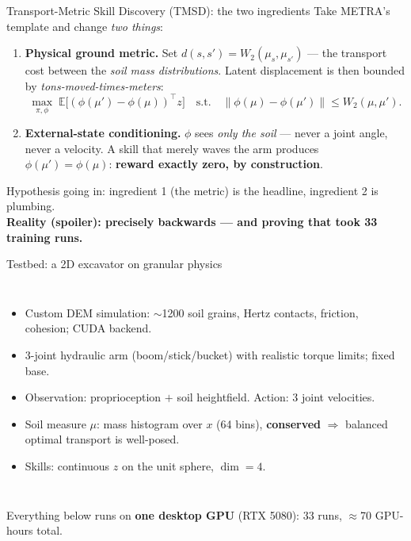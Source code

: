 \documentclass[aspectratio=169,11pt]{beamer}
\begin{document}
\begin{frame}{Transport-Metric Skill Discovery (TMSD): the two ingredients}
Take METRA's template and change \emph{two things}:

\begin{enumerate}
  \item \textbf{Physical ground metric.} Set $d(s,s') = W_2(\mu_s, \mu_{s'})$ --- the transport cost between the \emph{soil mass distributions}. Latent displacement is then bounded by \emph{tons-moved-times-meters}:
  \[
  \max_{\pi,\phi}\; \mathbb{E}\big[(\phi(\mu') - \phi(\mu))^{\top} z\big]
  \quad \text{s.t.} \quad \|\phi(\mu)-\phi(\mu')\| \le W_2(\mu, \mu').
  \]
  \item \textbf{External-state conditioning.} $\phi$ sees \emph{only the soil} --- never a joint angle, never a velocity. A skill that merely waves the arm produces $\phi(\mu')=\phi(\mu)$: \textbf{reward exactly zero, by construction}.
\end{enumerate}

\medskip
Hypothesis going in: ingredient 1 (the metric) is the headline, ingredient 2 is plumbing.\\
\textbf{Reality (spoiler): precisely backwards --- and proving that took 33 training runs.}
\end{frame}

\begin{frame}{Testbed: a 2D excavator on granular physics}
\begin{columns}
\begin{itemize}
  \item Custom DEM simulation: $\sim$1200 soil grains, Hertz contacts, friction, cohesion; CUDA backend.
  \item 3-joint hydraulic arm (boom/stick/bucket) with realistic torque limits; fixed base.
  \item Observation: proprioception $+$ soil heightfield. Action: 3 joint velocities.
  \item Soil measure $\mu$: mass histogram over $x$ (64 bins), \textbf{conserved} $\Rightarrow$ balanced optimal transport is well-posed.
  \item Skills: continuous $z$ on the unit sphere, $\dim = 4$.
\end{itemize}
\end{columns}
\medskip
Everything below runs on \textbf{one desktop GPU} (RTX 5080): 33 runs, $\approx$70 GPU-hours total.
\end{frame}
\end{document}
